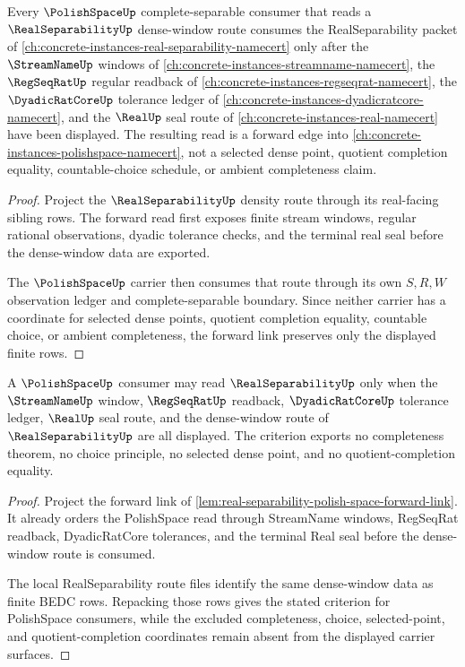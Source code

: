 \begin{lemma}
\label{lem:real-separability-polish-space-forward-link}
Every $\PolishSpaceUp$ complete-separable consumer that reads a $\RealSeparabilityUp$ dense-window route consumes the RealSeparability packet of \autoref{ch:concrete-instances-real-separability-namecert} only after the $\StreamNameUp$ windows of \autoref{ch:concrete-instances-streamname-namecert}, the $\RegSeqRatUp$ regular readback of \autoref{ch:concrete-instances-regseqrat-namecert}, the $\DyadicRatCoreUp$ tolerance ledger of \autoref{ch:concrete-instances-dyadicratcore-namecert}, and the $\RealUp$ seal route of \autoref{ch:concrete-instances-real-namecert} have been displayed. The resulting read is a forward edge into \autoref{ch:concrete-instances-polishspace-namecert}, not a selected dense point, quotient completion equality, countable-choice schedule, or ambient completeness claim.
\end{lemma}
\begin{proof}
Project the $\RealSeparabilityUp$ density route through its real-facing sibling rows. The forward read first exposes finite stream windows, regular rational observations, dyadic tolerance checks, and the terminal real seal before the dense-window data are exported.

The $\PolishSpaceUp$ carrier then consumes that route through its own $S,R,W$ observation ledger and complete-separable boundary. Since neither carrier has a coordinate for selected dense points, quotient completion equality, countable choice, or ambient completeness, the forward link preserves only the displayed finite rows.
\end{proof}

\begin{theorem}
\label{thm:real-separability-polish-forward-criterion}
A $\PolishSpaceUp$ consumer may read $\RealSeparabilityUp$ only when the $\StreamNameUp$ window, $\RegSeqRatUp$ readback, $\DyadicRatCoreUp$ tolerance ledger, $\RealUp$ seal route, and the dense-window route of $\RealSeparabilityUp$ are all displayed. The criterion exports no completeness theorem, no choice principle, no selected dense point, and no quotient-completion equality.
\end{theorem}
\begin{proof}
Project the forward link of \autoref{lem:real-separability-polish-space-forward-link}. It already orders the PolishSpace read through StreamName windows, RegSeqRat readback, DyadicRatCore tolerances, and the terminal Real seal before the dense-window route is consumed.

The local RealSeparability route files identify the same dense-window data as finite BEDC rows. Repacking those rows gives the stated criterion for PolishSpace consumers, while the excluded completeness, choice, selected-point, and quotient-completion coordinates remain absent from the displayed carrier surfaces.
\end{proof}
